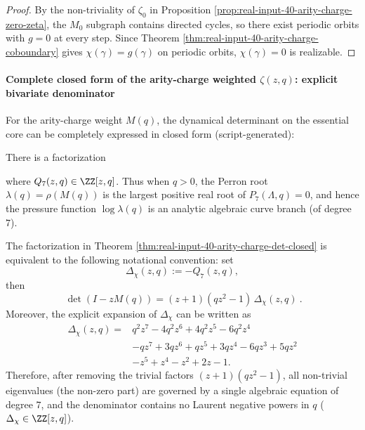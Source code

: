 \begin{proof}
By the non-triviality of $\zeta_0$ in Proposition \ref{prop:real-input-40-arity-charge-zero-zeta}, the $M_0$ subgraph contains directed cycles, so there exist periodic orbits with $g=0$ at every step.
Since Theorem \ref{thm:real-input-40-arity-charge-coboundary} gives $\chi(\gamma)=g(\gamma)$ on periodic orbits, $\chi(\gamma)=0$ is realizable.
\end{proof}

\paragraph{Complete closed form of the arity-charge weighted $\zeta(z,q)$: explicit bivariate denominator}
For the arity-charge weight $M(q)$, the dynamical determinant on the essential core can be completely expressed in closed form (script-generated):
\begin{theorem}\label{thm:real-input-40-arity-charge-det-closed}
There is a factorization

where $Q_7(z,q)\in\ZZ[z,q]$. Thus when $q>0$, the Perron root $\lambda(q)=\rho(M(q))$ is the largest positive real root of $P_7(\Lambda,q)=0$,
and hence the pressure function $\log\lambda(q)$ is an analytic algebraic curve branch (of degree $7$).
\end{theorem}

\begin{remark}\label{rem:real-input-40-arity-charge-delta-chi}
The factorization in Theorem \ref{thm:real-input-40-arity-charge-det-closed} is equivalent to the following notational convention: set
\[
\Delta_\chi(z,q):=-Q_7(z,q),
\]
then
\[
\boxed{\ \det(I-zM(q))=(z+1)(qz^2-1)\,\Delta_\chi(z,q)\ }.
\]
Moreover, the explicit expansion of \(\Delta_\chi\) can be written as
\[
\boxed{
\begin{aligned}
\Delta_\chi(z,q)
={}&q^2z^7-4q^2z^6+4q^2z^5-6q^2z^4\\
&-qz^7+3qz^6+qz^5+3qz^4-6qz^3+5qz^2\\
&-z^5+z^4-z^2+2z-1.
\end{aligned}}
\]
Therefore, after removing the trivial factors \((z+1)(qz^2-1)\), all non-trivial eigenvalues (the non-zero part) are governed by a single algebraic equation of degree \(7\), and the denominator contains no Laurent negative powers in \(q\) (\(\Delta_\chi\in\ZZ[z,q]\)).
\end{remark}

